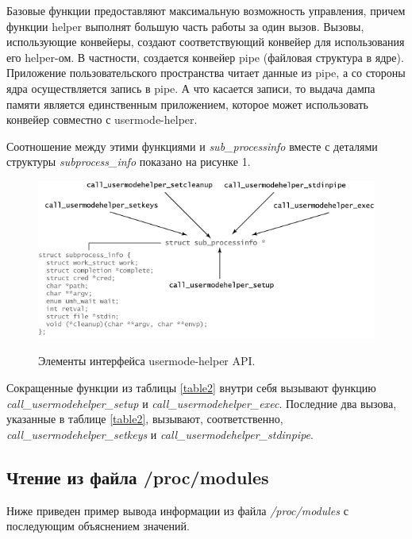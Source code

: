 \documentclass[a4paper,14pt]{extarticle}
\begin{document}
 	Базовые функции предоставляют максимальную возможность управления, причем функции helper выполнят большую часть работы за один вызов. Вызовы, использующие конвейеры, создают соответствующий конвейер для использования его helper-ом. В частности, создается конвейер pipe (файловая структура в ядре). Приложение пользовательского пространства читает данные из pipe, а со стороны ядра осуществляется запись в pipe. А что касается записи, то выдача дампа памяти является единственным приложением, которое может использовать конвейер совместно с usermode-helper.
 	
 	\newpage
 	
 	Соотношение между этими функциями и \textit{sub\_processinfo} вместе с деталями структуры \textit{subprocess\_info} показано на рисунке 1.
 	
 	\begin{figure}[h!]
 		\begin{center}
 			{\includegraphics[scale = 0.6]{img/ris1.png}}
 			\label{ris:1}
 		\end{center}
 		\caption{Элементы интерфейса usermode-helper API.}
 	\end{figure}
 
 	Сокращенные функции из таблицы \ref{table2} внутри себя вызывают функцию \textit{call\_usermodehelper\_setup} и \textit{call\_usermodehelper\_exec}. Последние два вызова, указанные в таблице \ref{table2}, вызывают, соответственно, \textit{call\_usermodehelper\_setkeys} и \textit{call\_usermodehelper\_stdinpipe}. 
 	
 	
 	\subsection{Чтение из файла /proc/modules}
 	
 	Ниже приведен пример вывода информации из файла \textit{/proc/modules} с последующим объяснением значений.
 	
\end{document}
